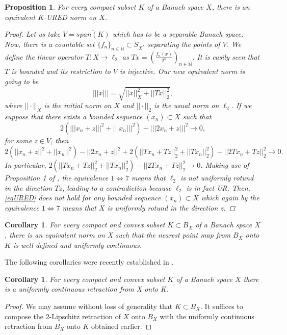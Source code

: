 \documentclass[11pt]{amsart}
\newcommand{\N}{\mathbb{N}}
\newcommand{\<}{\langle}
\renewcommand{\>}{\rangle}
\newtheorem{prop}[theorem]{Proposition}
\newtheorem{corollary}[theorem]{Corollary}
\theoremstyle{definition}
\theoremstyle{remark}
\numberwithin{equation}{section}
\begin{document}
\begin{prop}
For every compact subset $K$ of a Banach space $X$, there is an equivalent $K$-URED norm on $X$.
\begin{proof}
Let us take $V=\overline{span(K)}$ which has to be a separable Banach space. Now, there is a countable set $\{f_n\}_{n\in\N}\subset S_{X^*}$ separating the points of $V$. We define the linear operator  $T:X\rightarrow\ell_2$ as $Tx=\left(\frac{f_n(x)}{2^n}\right)_{n\in\N}$. It is easily seen that $T$ is  bounded and its restriction to $V$ is injective. Our new equivalent norm is going to be
$$|||x|||=\sqrt{||x||_X^2+||Tx||_2^2},$$
where $||\cdot||_X$ is the initial norm on $X$ and $||\cdot||_2$ is the usual norm on $\ell_2$. If we suppose that there exists a bounded sequence $(x_n)\subset X$ such that
\begin{equation}\label{eqURED}2(|||x_n+z|||^2+|||x_n|||^2)-|||2x_n+z|||^2\rightarrow 0,\end{equation}
for some $z\in V$, then
$$2(||x_n+z||^2+||x_n||^2)-||2x_n+z||^2+2(||Tx_n+Tz||_2^2+||Tx_n||_2^2)-||2Tx_n+Tz||_2^2\rightarrow0.$$
In particular, $2(||Tx_n+Tz||_2^2+||Tx_n||_2^2)-||2Tx_n+Tz||_2^2\rightarrow0$. Making use of Proposition 1 of \cite{Ziz1}, the equivalence $1\Leftrightarrow7$ means that $\ell_2$ is not uniformly rotund in the direction $Tz$, leading to a contradiction because $\ell_2$ is in fact UR. Then, \eqref{eqURED} does not hold for any bounded sequence $(x_n)\subset X$ which again by the equivalence $1\Leftrightarrow7$ means that $X$ is uniformly rotund in the direction z.
\end{proof}
\end{prop}

\begin{corollary}
For every compact and convex subset $K\subset B_X$ of a Banach space $X$, there is an equivalent norm on X such that the nearest point map from $B_X$ onto $K$  is well defined and uniformly continuous. 
\end{corollary}

The following corollaries were recently established in \cite{CCW21}.
\begin{corollary}\label{corUC}
For every compact and convex subset $K$ of a Banach space $X$ there is a uniformly continuous retraction from X onto K.
\end{corollary}
\begin{proof}
We may assume without loss of generality that $K\subset B_X$.
It suffices to compose the $2$-Lipschitz retraction of $X$ onto $B_X$ with the uniformly continuous retraction from $B_X$ onto $K$ obtained earlier.
\end{proof}
\end{document}

